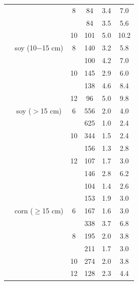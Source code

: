 \documentclass[authoryear]{elsarticle}
\begin{document}
\begin{table}[h]
{\begin{tabular}{lccccc}
      &  & 8 & 84  & 3.4 & 7.0\\
      &  &   & 84  & 3.5 & 5.6\\
      &  & 10& 101 & 5.0 & 10.2\\
      \cmidrule(1r){2-6}
      & soy (10$-$15 cm)
         & 8 & 140 & 3.2 & 5.8\\
      &  &   & 100 & 4.2 & 7.0\\
      &  & 10& 145 & 2.9 & 6.0\\
      &  &   & 138 & 4.6 & 8.4\\
      &  & 12& 96  & 5.0 & 9.8\\
      \cmidrule(1r){2-6}
      & soy ($>$15 cm)
         & 6 & 556 & 2.0 & 4.0\\
      &  &   & 625 & 1.0 & 2.4\\
      &  & 10& 344 & 1.5 & 2.4\\
      &  &   & 156 & 1.3 & 2.8\\
      &  & 12& 107 & 1.7 & 3.0\\
      &  &   & 146 & 2.8 & 6.2\\
      &  &   & 104 & 1.4 & 2.6\\
      &  &   & 153 & 1.9 & 3.0\\
      \cmidrule(1r){2-6}
      & corn ($\ge$15 cm)
         & 6 & 167 & 1.6 & 3.0\\
      &  &   & 338 & 3.7 & 6.8\\
      &  & 8 & 195 & 2.0 & 3.8 \\
      &  &   & 211 & 1.7 & 3.0\\
      &  & 10& 274 & 2.0 & 3.8\\
      &  & 12& 128 & 2.3 & 4.4\\
      \bottomrule
    \end{tabular}
  }
  \label{table:all_trials}
\end{table}

\begin{table}[h]
  \centering
  \caption{RMSE and 95$^{th}$ Percentile
    with respect to crop-stage.} 
  \label{table:travel_speed}
\end{table}
\end{document}
